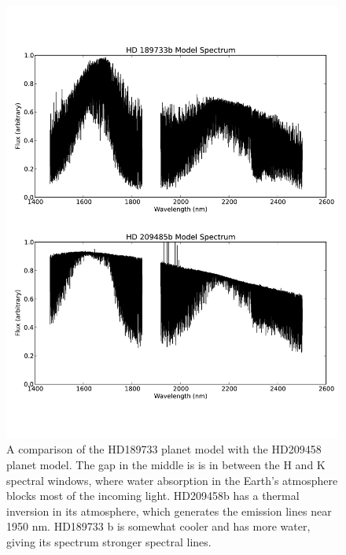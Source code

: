 \begin{figure}[ht]
  \centering
  \includegraphics[width=5.5in]{Figures/paper2_fig3.pdf}
  \caption{A comparison of the HD189733 planet model with the HD209458
  planet model. The gap in the middle is is in between the H and K
  spectral windows, where water absorption in the Earth's atmosphere
  blocks most of the incoming light. HD209458b has a thermal inversion
  in its atmosphere, which generates the emission lines near 1950
  nm. HD189733 b is somewhat cooler and has more water, giving its
  spectrum stronger spectral lines.}
  \label{paper2_fig:modelcomp}
\end{figure}


